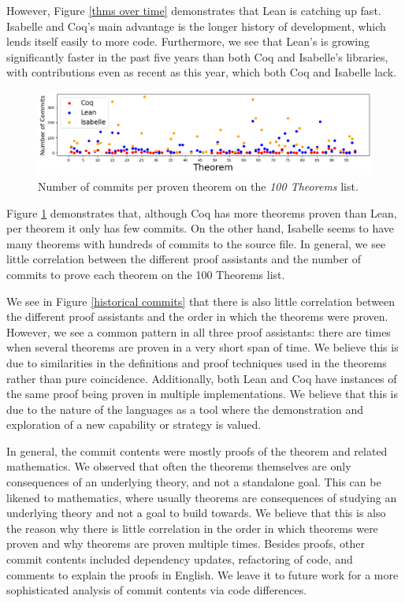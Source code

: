 \documentclass[sigconf,nonacm]{acmart}
\begin{document}
However, Figure \ref{thms over time} demonstrates that Lean is catching up fast. Isabelle and Coq's main advantage is the longer history of development, which lends itself easily to more code. Furthermore, we see that Lean's \mathlib is growing significantly faster in the past five years than both Coq and Isabelle's libraries, with contributions even as recent as this year, which both Coq and Isabelle lack.

\begin{figure}[H]
  \includegraphics[scale=0.25]{test.png}
  \caption{Number of commits per proven theorem on the \textit{100 Theorems} list.}
  \label{number of commits}
\end{figure}

Figure \ref{number of commits} demonstrates that, although Coq has more theorems proven than Lean, per theorem it only has few commits. On the other hand, Isabelle seems to have many theorems with hundreds of commits to the source file. In general, we see little correlation between the different proof assistants and the number of commits to prove each theorem on the 100 Theorems list. 

We see in Figure \ref{historical commits} that there is also little correlation between the different proof assistants and the order in which the theorems were proven. However, we see a common pattern in all three proof assistants: there are times when several theorems are proven in a very short span of time. We believe this is due to similarities in the definitions and proof techniques used in the theorems rather than pure coincidence. Additionally, both Lean and Coq have instances of the same proof being proven in multiple implementations. We believe that this is due to the nature of the languages as a tool where the demonstration and exploration of a new capability or strategy is valued.

In general, the commit contents were mostly proofs of the theorem and related mathematics. We observed that often the theorems themselves are only consequences of an underlying theory, and not a standalone goal. This can be likened to mathematics, where usually theorems are consequences of studying an underlying theory and not a goal to build towards. We believe that this is also the reason why there is little correlation in the order in which theorems were proven and why theorems are proven multiple times. Besides proofs, other commit contents included dependency updates, refactoring of code, and comments to explain the proofs in English. We leave it to future work for a more sophisticated analysis of commit contents via code differences.
\end{document}
